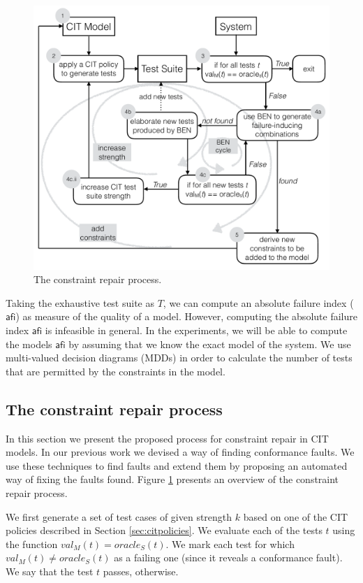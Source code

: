 \begin{tikzborder}{\cite{Gargantini16:validation}}
\begin{tikzborder}{\cite{gargantini_combinatorial_2017}}
\begin{figure}[H]
	\centering
	\includegraphics[width=.7\columnwidth]{images/constraintsrepair3.pdf}
	\caption{The constraint repair process.}\label{fig:constraintsrepair}
	\label{fig:repair}
\end{figure}

\bb Taking the exhaustive test suite as $T$, we can compute an absolute failure index ($\mathsf{afi}$) as measure of the quality of a model. However, computing the absolute failure index $\mathsf{afi}$ is infeasible in general. In the experiments, we will be able to compute the models $\mathsf{afi}$ by assuming that we know the exact model of the system. We use multi-valued decision diagrams (MDDs) \cite{hvc14} in order to calculate the number of tests that are permitted by the constraints in the model.\be

\subsection{The constraint repair process}\label{sec:constr_repair}

\bb In this section we present the proposed process for constraint repair in CIT models. In our previous work \cite{Gargantini16:validation} we devised a way of finding conformance faults. We use these techniques to find faults and extend them by proposing an automated way of fixing the faults found.  
Figure \ref{fig:repair} presents an overview of the constraint repair process.


We first generate a set of test cases of given strength $k$ based on one of the CIT policies described in Section \ref{sec:citpolicies}. We evaluate each of the tests $t$ using the function $val_{M}(t)=\mathit{oracle}_{S}(t)$. We mark each test for which $val_{M}(t)\neq\mathit{oracle}_{S}(t)$ as a failing one (since it reveals a conformance fault). We say that the test $t$ passes, otherwise. 


\end{tikzborder}
\end{tikzborder}
